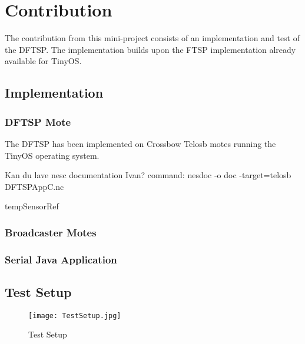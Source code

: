 \documentclass[Main]{subfiles}
\begin{document}
\section{Contribution} %
\label{sec:contribution}

	The contribution from this mini-project consists of an implementation and test of the DFTSP.
	The implementation builds upon the FTSP implementation already available for TinyOS\cite{FTSPImplementationTinyOS:Online}.
	\subsection{Implementation} %
	\label{sub:implementation}

		\subsubsection{DFTSP Mote} %
		\label{sub:dftsp_mote}
			The DFTSP has been implemented on Crossbow Telosb motes\cite{TelosBDatasheet:Online} running the TinyOS\cite{TinyOS:Online} operating system.

			Kan du lave nesc documentation Ivan? 
			command: nesdoc -o doc -target=telosb DFTSPAppC.nc

		tempSensorRef \cite{tempSensorDatasheet}
		
		
		\subsubsection{Broadcaster Motes} %
		\label{sub:broadcaster_mote}
		
	

		
		\subsubsection{Serial Java Application} %
		\label{sub:serial_java_application}
		


	\subsection{Test Setup} %
	\label{sub:test_setup}

		\begin{figure}[H]
			\centering
			\texttt{[image: TestSetup.jpg]}
			\caption{Test Setup}
			\label{fig:TestSetup}
		\end{figure}
	
\end{document}
